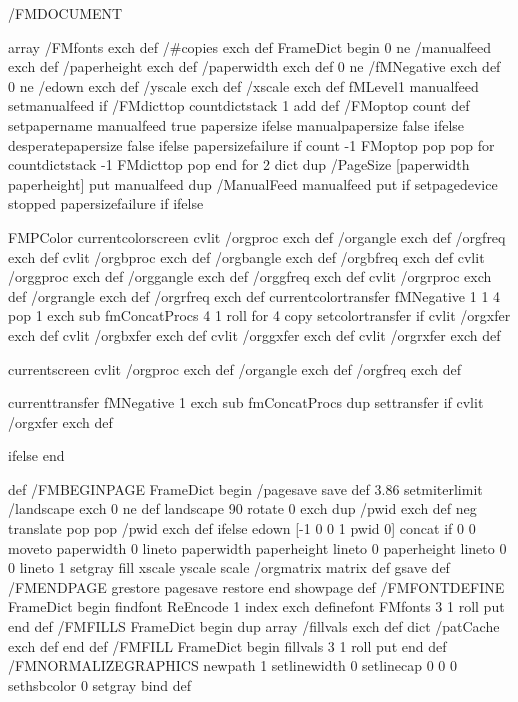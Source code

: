 /FMDOCUMENT { 
	array /FMfonts exch def 
	/#copies exch def
	FrameDict begin
	0 ne /manualfeed exch def
	/paperheight exch def
	/paperwidth exch def
	0 ne /fMNegative exch def 
	0 ne /edown exch def 
	/yscale exch def
	/xscale exch def
	fMLevel1 {
		manualfeed {setmanualfeed} if
		/FMdicttop countdictstack 1 add def 
		/FMoptop count def 
		setpapername 
		manualfeed {true} {papersize} ifelse 
		{manualpapersize} {false} ifelse 
		{desperatepapersize} {false} ifelse 
		{papersizefailure} if
		count -1 FMoptop {pop pop} for
		countdictstack -1 FMdicttop {pop end} for 
		}
		{2 dict
		 dup /PageSize [paperwidth paperheight] put
		 manualfeed {dup /ManualFeed manualfeed put} if
		 {setpagedevice} stopped {papersizefailure} if
		}
	ifelse 
	
	FMPColor {
		currentcolorscreen
			cvlit /orgproc exch def
				  /organgle exch def 
				  /orgfreq exch def
			cvlit /orgbproc exch def
				  /orgbangle exch def 
				  /orgbfreq exch def
			cvlit /orggproc exch def
				  /orggangle exch def 
				  /orggfreq exch def
			cvlit /orgrproc exch def
				  /orgrangle exch def 
				  /orgrfreq exch def
			currentcolortransfer 
			fMNegative {
				1 1 4 { 
					pop { 1 exch sub } fmConcatProcs 4 1 roll
				} for
				4 copy
				setcolortransfer
			} if
			cvlit /orgxfer exch def
			cvlit /orgbxfer exch def
			cvlit /orggxfer exch def
			cvlit /orgrxfer exch def
	} {
		currentscreen 
			cvlit /orgproc exch def
				  /organgle exch def 
				  /orgfreq exch def
				  
		currenttransfer 
		fMNegative {
			{ 1 exch sub } fmConcatProcs
			dup settransfer
		} if 
		cvlit /orgxfer exch def
	} ifelse
	end 
} def 
/FMBEGINPAGE { 
	FrameDict begin 
	/pagesave save def
	3.86 setmiterlimit
	/landscape exch 0 ne def
	landscape { 
		90 rotate 0 exch dup /pwid exch def neg translate pop 
	}{
		pop /pwid exch def
	} ifelse
	edown { [-1 0 0 1 pwid 0] concat } if
	0 0 moveto paperwidth 0 lineto paperwidth paperheight lineto 
	0 paperheight lineto 0 0 lineto 1 setgray fill
	xscale yscale scale
	/orgmatrix matrix def
	gsave 
} def 
/FMENDPAGE {
	grestore 
	pagesave restore
	end 
	showpage
	} def 
/FMFONTDEFINE { 
	FrameDict begin
	findfont 
	ReEncode 
	1 index exch 
	definefont 
	FMfonts 3 1 roll 
	put
	end 
	} def 
/FMFILLS {
	FrameDict begin dup
	array /fillvals exch def
	dict /patCache exch def
	end 
	} def 
/FMFILL {
	FrameDict begin
	 fillvals 3 1 roll put
	end 
	} def 
/FMNORMALIZEGRAPHICS { 
	newpath
	1 setlinewidth
	0 setlinecap
	0 0 0 sethsbcolor
	0 setgray 
	} bind def

